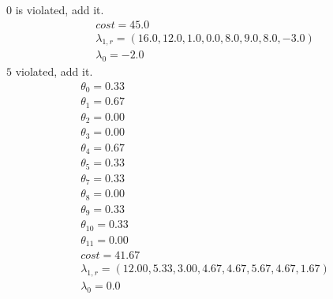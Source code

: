 \documentclass{article}
\begin{document}
    $0$ is violated, add it.
    \begin{equation*}
        \begin{array}{c}
            cost = 45.0\\
            \lambda_{1,r} = (16.0,12.0,1.0,0.0,8.0,9.0,8.0,-3.0)\\
            \lambda_0 = -2.0
        \end{array}
    \end{equation*}
    $5$ violated, add it.
    \begin{equation*}
        \begin{array}{c}
            \theta_{0} = 0.33\\
            \theta_{1} = 0.67\\
            \theta_{2} = 0.00\\
            \theta_{3} = 0.00\\
            \theta_{4} = 0.67\\
            \theta_{5} = 0.33\\
            \theta_{7} = 0.33\\
            \theta_{8} = 0.00\\
            \theta_{9} = 0.33\\
            \theta_{10} = 0.33\\
            \theta_{11} = 0.00\\
            cost = 41.67\\
            \lambda_{1,r} = (12.00,5.33,3.00,4.67,4.67,5.67,4.67,1.67)\\
            \lambda_0 = 0.0
        \end{array}
    \end{equation*}
\end{document}
